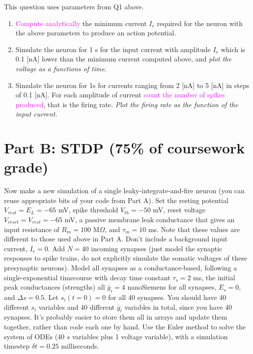 \documentclass[12pt]{article}
\begin{document}
This question uses parameters from Q1 above.

\begin{enumerate}

\item \textcolor{magenta}{Compute analytically} the minimum current $I_e$ required for the
  neuron with the above parameters to produce an action
  potential.

\item Simulate the neuron for 1 s for the input current with amplitude
  $I_e$ which is 0.1 [nA] lower than the minimum current computed
  above, and \emph{plot the voltage as a functions of time}.

\item Simulate the neuron for 1s for currents ranging from 2 [nA] to 5
  [nA] in steps of 0.1 [nA]. For each amplitude of current \textcolor{magenta}{count the
  number of spikes produced}, that is the firing rate. \emph{Plot the firing
  rate as the function of the input current.} 

\end{enumerate}

\section*{Part B: STDP (75\% of coursework grade)}
Now make a new simulation of a single leaky-integrate-and-fire neuron (you can reuse appropriate bits of your code from Part A). Set the resting potential $V_{rest}= E_L = -65$ mV,
spike threshold $V_{th}=-50$ mV, reset voltage $V_{reset}=V_{rest}=-65$
mV, a passive membrane leak conductance that gives an input resistance
of $R_{m}=100$ M$\Omega$, and $\tau_{m}=10$
ms. Note that these values are different to those used above in Part A. Don't include a background input current, $I_e=0$. Add $N=40$ incoming synapses (just model the synaptic responses to spike trains, do not
explicitly simulate the somatic voltages of these presynaptic neurons).
Model all synapses as a conductance-based, following a single-exponential
timecourse with decay time constant $\tau_{s}=2$ ms, the initial
peak conductances (strengths) all $\bar{g}_i = 4$ nanoSiemens for all synapses, $E_s=0$, and $\Delta s=0.5$. Let $s_i (t=0)=0$ for all 40 synapses. You should have 40 different $s_i$ variables and 40 different $\bar{g}_i$ variables in total, since you have 40 synapses. It's probably easier to store them all in arrays and update them together, rather than code each one by hand. Use the Euler method to solve the system of ODEs (40 $s$ variables plus 1 voltage variable), with a simulation timestep $\delta t=0.25$ milliseconds.
\end{document}
